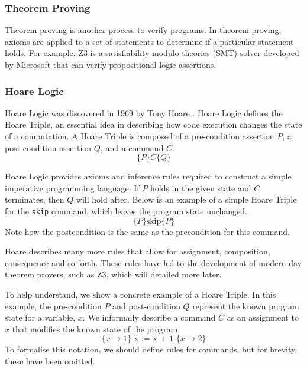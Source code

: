 \subsubsection{Theorem Proving}
Theorem proving is another process to verify programs. In theorem proving, axioms are applied to a set of statements to determine if a particular statement holds. For example, Z3 \cite{z3} is a satisfiability modulo theories (SMT) solver developed by Microsoft that can verify propositional logic assertions.
\subsubsection{Hoare Logic}
Hoare Logic was discovered in 1969 by Tony Hoare \cite{hoare_logic}. Hoare Logic defines the Hoare Triple, an essential idea in describing how code execution changes the state of a computation. A Hoare Triple is composed of a pre-condition assertion $P$, a post-condition assertion $Q$, and a command $C$.
\[
\{P\} C \{Q\}
\]
\par
Hoare Logic provides axioms and inference rules required to construct a simple imperative programming language. If $P$ holds in the given state and $C$ terminates, then $Q$ will hold after. Below is an example of a simple Hoare Triple for the \texttt{skip} command, which leaves the program state unchanged.
\[
    \{P\} \text{skip} \{P\}
\]
Note how the postcondition is the same as the precondition for this command.
\par
Hoare describes many more rules that allow for assignment, composition, consequence and so forth. These rules have led to the development of modern-day theorem provers, such as Z3, which will detailed more later.
\par
To help understand, we show a concrete example of a Hoare Triple. In this example, the pre-condition $P$ and post-condition $Q$ represent the known program state for a variable, $x$. We informally describe a command $C$ as an assignment to $x$ that modifies the known state of the program.
\[
\{ x \rightarrow 1 \} \text{ x := x + 1 } \{ x \rightarrow 2 \}
\]
To formalise this notation, we should define rules for commands, but for brevity, these have been omitted.

